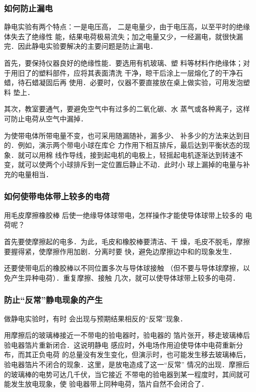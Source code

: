 \subsubsection{如何防止漏电}

静电实验有两个特点：一是电压高，
二是电量少，由于电压高，以至平时的绝缘体失去了绝缘性
能，结果电荷极易流失；加之电量又少，一经漏电，就很快漏
完．因此静电实验要解决的主要问题是防止漏电．

首先，要保持仪器良好的绝缘性能．要选用有机玻璃、塑
料等材料作绝缘体；对于用旧了的塑料部件，应将其表面清洗
干净，晾干后涂上一层熔化了的干净石蜡，待石蜡凝固后再
使用．必要时，仪器不要直接放在桌上做实验，可用发泡塑料
垫上．

其次，教室要通气，要避免空气中有过多的二氧化碳、水
蒸气或各种离子，这样可防止电荷从空气中漏掉．

为使带电体所带电量不变，也可采用随漏随补，漏多少、
补多少的方法来达到目的．例如，演示两个带电小球在库仑
力作用下相互排斥，最后达到平衡状态的现象．就可以用棉
线作导线，接到起电机的电极上，轻摇起电机逐渐达到转速不
变，就可以使两个小球排斥到一定位置后静止不动．此时小
球上漏掉的电量与补充的电量相当．


\subsubsection{如何使带电体带上较多的电荷}
用毛皮摩擦橡胶棒
后使一绝缘导体球带电，怎样操作才能使导体球带上较多的
电荷呢？

首先要使摩擦起的电多．为此，毛皮和橡胶棒要清洁、干
燥，毛皮不脱毛，摩擦要握得紧，使摩擦作用加剧．分离时要
快，避免边摩擦边中和的现象发生．

还要使带电后的橡胶棒以不同位置多次与导体球接触
（但不要与导体球摩擦，以免产生异种电荷）．重复摩擦、接触
几次，就可以使导体球带上较多的电荷．

\subsubsection{防止“反常”静电现象的产生}

做静电实验时，有时
会出现与预期结果相反的“反常”现象．

用摩擦后的玻璃棒接近一不带电的验电器时，验电器的
箔片张开，移走玻璃棒后验电器箔片重新闭合．这说明静电
感应时，外电场作用迫使导体中电荷重新分布，而其正负电荷
的总量没有发生变化，但演示时，也可能发生移去玻璃棒后，
验电器箔片不闭合的现象．这里，是放电造成了这一“反常”
情况的出现．摩擦后的玻璃棒的电势可达几千伏，当它接近
不带电的验电器到某一程度时，其间就可能发生放电现象，使
验电器带上同种电荷，箔片自然不会闭合了．

